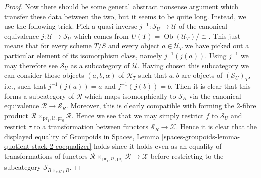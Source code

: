 \documentclass{stacks-project}
\theoremstyle{plain}
\theoremstyle{definition}
\theoremstyle{remark}
\numberwithin{equation}{subsection}
\def\Ob{\mathop{\mathrm{Ob}}\nolimits}
\begin{document}
\begin{proof}
\medskip\noindent
Now there should be some general abstract nonsense
argument which transfer these data between the two, but it seems to
be quite long. Instead, we use the following trick.
Pick a quasi-inverse $j^{-1} : \mathcal{S}_U \to \mathcal{U}$
of the canonical equivalence $j : \mathcal{U} \to \mathcal{S}_U$ which comes
from $U(T) = \Ob(\mathcal{U}_T)/\!\!\cong$.
This just means that for every scheme $T/S$ and every
object $a \in \mathcal{U}_T$ we have picked out a particular
element of its isomorphism class, namely $j^{-1}(j(a))$.
Using $j^{-1}$ we may therefore see $\mathcal{S}_U$
as a subcategory of $\mathcal{U}$. Having chosen this subcategory
we can consider those objects $(a, b, \alpha)$ of $\mathcal{R}_T$
such that $a, b$ are objects of $(\mathcal{S}_U)_T$, i.e., such
that $j^{-1}(j(a)) = a$ and $j^{-1}(j(b)) = b$. Then it is clear that
this forms a subcategory of $\mathcal{R}$ which maps isomorphically
to $\mathcal{S}_R$ via the canonical equivalence
$\mathcal{R} \to \mathcal{S}_R$. Moreover, this is clearly compatible
with forming the $2$-fibre product
$\mathcal{R} \times_{\text{pr}_1, \mathcal{U}, \text{pr}_0} \mathcal{R}$.
Hence we see that we may simply restrict
$f$ to $\mathcal{S}_U$ and restrict $\tau$ to a transformation
between functors $\mathcal{S}_R \to \mathcal{X}$. Hence it is clear that
the displayed equality of
Groupoids in Spaces,
Lemma \ref{spaces-groupoids-lemma-quotient-stack-2-coequalizer}
holds since it holds even as an equality of transformations of functors
$\mathcal{R} \times_{\text{pr}_1, \mathcal{U}, \text{pr}_0} \mathcal{R}
\to \mathcal{X}$ before restricting to the subcategory
$\mathcal{S}_{R \times_{s, U, t} R}$.


\end{proof}
\end{document}
